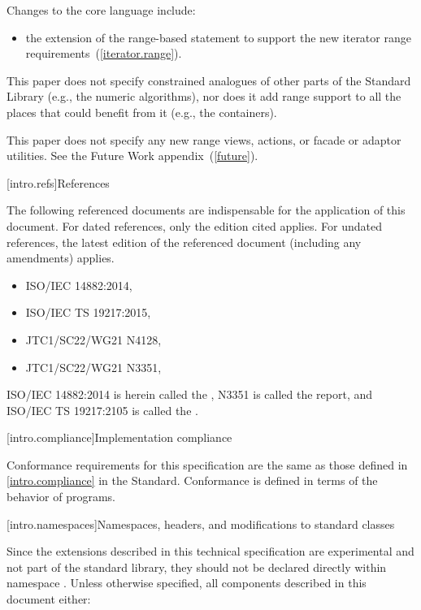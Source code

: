 \pnum
Changes to the core language include:

\begin{itemize}
\item the extension of the range-based  statement to support
the new iterator range requirements~(\ref{iterator.range}).
\end{itemize}

\pnum
This paper does not specify constrained analogues of other parts of the Standard
Library (e.g., the numeric algorithms), nor does it add range support to all the
places that could benefit from it (e.g., the containers).

\pnum
This paper does not specify any new range views, actions, or facade or adaptor
utilities. See the Future Work appendix~(\ref{future}).

[intro.refs]{References}

\pnum
The following referenced documents are indispensable for the
application of this document. For dated references, only the
edition cited applies. For undated references, the latest edition
of the referenced document (including any amendments) applies.

\begin{itemize}
\item ISO/IEC 14882:2014, 
\item ISO/IEC TS 19217:2015, 
\item JTC1/SC22/WG21 N4128, 
\item JTC1/SC22/WG21 N3351, 
\end{itemize}

ISO/IEC 14882:2014 is herein called the , N3351 is called the
 report, and ISO/IEC TS 19217:2105 is called the .

[intro.compliance]{Implementation compliance}

\pnum
Conformance requirements for this specification are the same as those
defined in \ref{intro.compliance} in the \Cpp Standard.
\enternote
Conformance is defined in terms of the behavior of programs.
\exitnote

[intro.namespaces]{Namespaces, headers, and modifications to standard classes}

\pnum
Since the extensions described in this technical specification are experimental and not
part of the \Cpp standard library, they should not be declared directly within namespace
. Unless otherwise specified, all components described in this document either:

